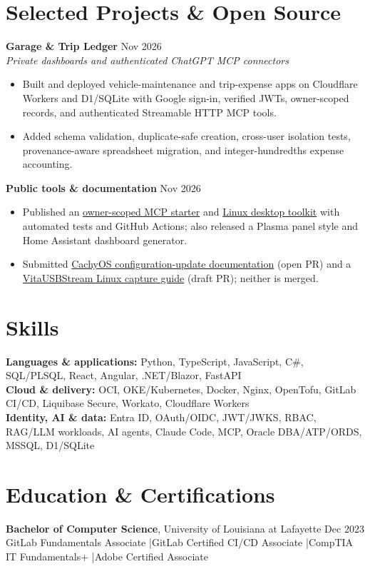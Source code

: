 \documentclass[10pt,letterpaper]{article}
\begin{document}
\section*{Selected Projects \& Open Source}
\textbf{Garage \& Trip Ledger} \hfill Nov 2026\\[-1pt]
\textit{Private dashboards and authenticated ChatGPT MCP connectors}
\begin{itemize}
  \item Built and deployed vehicle-maintenance and trip-expense apps on Cloudflare Workers and D1/SQLite with Google sign-in, verified JWTs, owner-scoped records, and authenticated Streamable HTTP MCP tools.
  \item Added schema validation, duplicate-safe creation, cross-user isolation tests, provenance-aware spreadsheet migration, and integer-hundredths expense accounting.
\end{itemize}
\textbf{Public tools \& documentation} \hfill Nov 2026
\begin{itemize}
  \item Published an \href{https://github.com/rommethecoder/private-mcp-starter}{owner-scoped MCP starter} and \href{https://github.com/rommethecoder/desktop-toolkit}{Linux desktop toolkit} with automated tests and GitHub Actions; also released a Plasma panel style and Home Assistant dashboard generator.
  \item Submitted \href{https://github.com/CachyOS/wiki/pull/660}{CachyOS configuration-update documentation} (open PR) and a \href{https://github.com/BMK-Studio/VitaUSBStream/pull/31}{VitaUSBStream Linux capture guide} (draft PR); neither is merged.
\end{itemize}

\section*{Skills}
\textbf{Languages \& applications:} Python, TypeScript, JavaScript, C\#, SQL/PLSQL, React, Angular, .NET/Blazor, FastAPI\\
\textbf{Cloud \& delivery:} OCI, OKE/Kubernetes, Docker, Nginx, OpenTofu, GitLab CI/CD, Liquibase Secure, Workato, Cloudflare Workers\\
\textbf{Identity, AI \& data:} Entra ID, OAuth/OIDC, JWT/JWKS, RBAC, RAG/LLM workloads, AI agents, Claude Code, MCP, Oracle DBA/ATP/ORDS, MSSQL, D1/SQLite

\section*{Education \& Certifications}
\textbf{Bachelor of Computer Science}, University of Louisiana at Lafayette \hfill Dec 2023\\
GitLab Fundamentals Associate \enspace|\enspace GitLab Certified CI/CD Associate \enspace|\enspace CompTIA IT Fundamentals+ \enspace|\enspace Adobe Certified Associate
\end{document}
